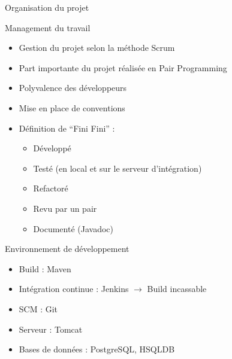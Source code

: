 \begin{frame}
	\begin{center}
		\huge{Organisation du projet}
	\end{center}
\end{frame}

\begin{frame}{Management du travail}
	\begin{itemize}
		\item Gestion du projet selon la m\'ethode Scrum
		\item Part importante du projet r\'ealis\'ee en Pair Programming
		\item Polyvalence des d\'eveloppeurs
		\item Mise en place de conventions
		\item D\'efinition de ``Fini Fini'' :
		\begin{itemize}
			\item D\'evelopp\'e
			\item Test\'e (en local et sur le serveur d'int\'egration)
			\item Refactor\'e
			\item Revu par un pair
			\item Document\'e (Javadoc)

		\end{itemize}
	\end{itemize}
\end{frame}

\begin{frame}{Environnement de d\'eveloppement}
	\begin{itemize}
		\item Build : Maven
		\item Int\'egration continue : Jenkins $\rightarrow$ Build incassable
		\item SCM : Git
		\item Serveur : Tomcat
		\item Bases de donn\'ees : PostgreSQL, HSQLDB
	\end{itemize}
\end{frame}


